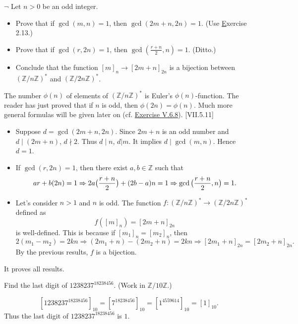 \begin{problem}[2.15]
$\neg$ Let $n > 0$ be an odd integer.
  \begin{itemize}
    \item Prove that if $\gcd(m, n) = 1$, then $\gcd(2m + n, 2n) = 1$. (Use \hyperlink{Exercise II.2.13}Exercise 2.13.)
    \item Prove that if $\gcd(r, 2n) = 1$, then $\gcd(\frac{r+n}{2}, n) = 1$. (Ditto.)
    \item Conclude that the function $[m]_n\rightarrow[2m + n]_{2n}$ is a bijection between $(\mathbb{Z}/n\mathbb{Z})^*$ and $(\mathbb{Z}/2n\mathbb{Z})^*$.
  \end{itemize}
The number $\phi(n)$ of elements of $(\mathbb{Z}/n\mathbb{Z})^*$ is Euler’s $\phi(n)$-function. The reader has just proved that if $n$ is odd, then $\phi(2n) = \phi(n)$. Much more general formulas will be given later on (cf. \hyperlink{Exercise V.6.8}{Exercise V.6.8}). [VII.5.11]
\end{problem}
\begin{solution}
  \begin{itemize}
    \item Suppose $d=\gcd(2m+n,2n)$. Since $2m+n$ is an odd number and $d \mid (2m+n)$, $d \nmid 2$. Thus $d\mid n$,  $d | m$. It implies $d \mid \gcd(m,n)$. Hence $d=1$.
    \item If $\gcd(r, 2n) = 1$, then there exist $a,b\in\mathbb{Z}$ such that 
    $$ar+b(2n) = 1\Rightarrow 2a\big{(}\frac{r+n}{2}\big{)} + (2b-a)n = 1\Rightarrow \gcd\big{(}\frac{r+n}{2}, n\big{)} = 1.$$
    \item Let's consider $n > 1$ and $n$ is odd. The function $f: (\mathbb{Z}/n\mathbb{Z})^* \to (\mathbb{Z}/2n\mathbb{Z})^*$ defined as 
    $$f([m]_n) = [2m + n]_{2n}$$ is well-defined. This is because if $[m_1]_n = [m_2]_n$, then 
    $$2(m_1-m_2) = 2kn \Rightarrow (2m_1+n) - (2m_2+n) = 2kn \Rightarrow [2m_1+n]_{2n} = [2m_2+n]_{2n}.$$ 
    By the previous results, $f$ is a bijection.
   \end{itemize} 
   It proves all results.
\end{solution}

\begin{problem}[2.16]
Find the last digit of $1238237^{18238456}$. (Work in $\mathbb{Z}/10\mathbb{Z}$.)
\end{problem}
\begin{solution}
$$[1238237^{18238456}]_{10} = [7^{18238456}]_{10} = [1^{4559614}]_{10}=[1]_{10}.$$
Thus the last digit of $1238237^{18238456}$ is $1$. 
\end{solution}

